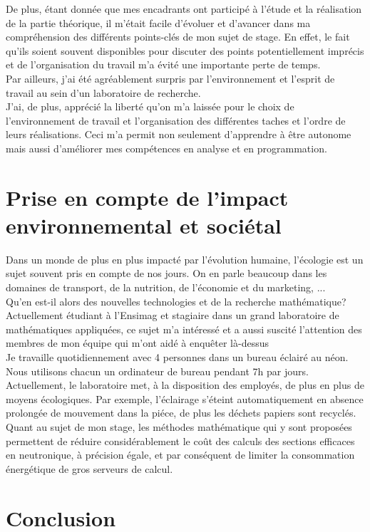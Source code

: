 De plus, étant donnée que mes encadrants ont participé à l'étude et la réalisation de la partie théorique, il m'était facile d'évoluer
et d'avancer dans ma compréhension des différents points-clés de mon sujet de stage. En effet, le fait qu'ils soient souvent disponibles
pour discuter des points potentiellement imprécis et de l'organisation du travail m'a évité une importante perte de temps.\\
Par ailleurs, j'ai été agréablement surpris par l'environnement et l'esprit de travail au sein d'un laboratoire de recherche.\\
J'ai, de plus, apprécié la liberté qu'on m'a laissée pour le choix de l'environnement de travail et l'organisation des différentes taches et l'ordre de leurs réalisations.
Ceci m'a permit non seulement d'apprendre à être autonome mais aussi d'améliorer mes compétences en analyse et en programmation.

\section{Prise en compte de l’impact environnemental et sociétal}\label{sec:8}
\hspace{0.5cm}
Dans un monde de plus en plus impacté par l’évolution humaine, l’écologie est un sujet
souvent pris en compte de nos jours. On en parle beaucoup dans les domaines de transport, de la nutrition, de l'économie et du marketing, ...\\
Qu’en est-il alors des nouvelles technologies et de la recherche mathématique?\\

Actuellement étudiant à l’Ensimag et stagiaire dans un grand laboratoire de mathématiques appliquées,
ce sujet m'a intéressé et a aussi suscité l’attention des membres de mon équipe qui m’ont aidé à enquêter là-dessus\\
Je travaille quotidiennement avec 4 personnes dans un bureau éclairé au néon.
Nous utilisons chacun un ordinateur de bureau pendant 7h par jours.\\
Actuellement, le laboratoire met, à la disposition des employés, de plus en plus de moyens écologiques.
Par exemple, l’éclairage s’éteint automatiquement en absence prolongée de mouvement dans la piéce, de plus les déchets papiers sont recyclés.\\
	Quant au sujet de mon stage, les méthodes mathématique qui y sont proposées permettent de réduire considérablement le coût des calculs des sections efficaces en neutronique,
à précision égale, et par conséquent de limiter la consommation énergétique de gros serveurs de calcul.

\section{Conclusion}\label{sec:9}

\newpage




